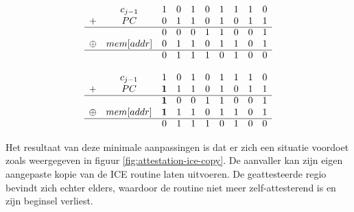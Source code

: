 \begin{equation} \label{eq:attestation-ice}
\begin{array}{cccccccccc}
       & c_{j-1}    & 1 &	0 &	1 &	0 &	1 &	1 &	1 &	0 \\
+	     & PC	        & 0	& 1	& 1	& 0	& 1	& 0	& 1	& 1 \\
\cline{1-10}
       &            &	0	& 0	& 0	& 1	& 1	& 0	& 0	& 1 \\
\oplus &	mem[addr]	& 0	& 1	& 1 &	0	& 1	& 1	& 0	& 1 \\
\cline{1-10}
       &            &	0	& 1	& 1	& 1	& 0	& 1	& 0	& 0 \\
\end{array}
\end{equation}

\begin{equation} \label{eq:attestation-ice-bitflip}
\begin{array}{cccccccccc}
       & c_{j-1}    & 1 &	0 &	1 &	0 &	1 &	1 &	1 &	0 \\
+	     & PC	        & \bm{1}	& 1	& 1	& 0	& 1	& 0	& 1	& 1 \\
\cline{1-10}
       &            &	\bm{1}	& 0	& 0	& 1	& 1	& 0	& 0	& 1 \\
\oplus &	mem[addr]	& \bm{1}	& 1	& 1 &	0	& 1	& 1	& 0	& 1 \\
\cline{1-10}
       &            &	0	& 1	& 1	& 1	& 0	& 1	& 0	& 0 \\
\end{array}
\end{equation}

Het resultaat van deze minimale aanpassingen is dat er zich een situatie
voordoet zoals weergegeven in figuur \ref{fig:attestation-ice-copy}. De
aanvaller kan zijn eigen aangepaste kopie van de ICE routine laten uitvoeren.
De geattesteerde regio bevindt zich echter elders, waardoor de routine niet
meer zelf-attesterend is en zijn beginsel verliest.

